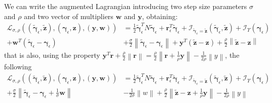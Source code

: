 \documentclass{svproc}
\newcommand{\vect}[1]{\bm{#1}}
\newcommand{\norm}[1]{\left\lVert#1\right\rVert}
\begin{document}
We can write the augmented Lagrangian introducing two step size parameters $\sigma$ and $\rho$ and two vector of multipliers $\vect{w}$ and $\vect{y}$, obtaining:
\begin{align}
\mathcal{L}_{\sigma,\rho} \left((\tilde{\vect{\gamma}}_\epsilon,\tilde{\vect{z}}),(\vect{\gamma}_\epsilon,\vect{z}),(\vect{y},\vect{w})\right) &= 
\frac{1}{2} \tilde{\vect{\gamma}}_\epsilon^T N \tilde{\vect{\gamma}}_\epsilon + \vect{r}^T_\epsilon \tilde{\vect{\gamma}}_\epsilon  
+  \mathcal{I}_{\tilde{\vect{\gamma}}_\epsilon = \tilde{\vect{z}}}(\tilde{\vect{\gamma}}_\epsilon,\tilde{\vect{z}}) 
+  \mathcal{I}_\Upsilon(\vect{\gamma}_\epsilon) \nonumber \\
+ \vect{w}^T (\tilde{\vect{\gamma}}_\epsilon - \vect{\gamma}_\epsilon) 
&+ \frac{\sigma}{2} \norm{\tilde{\vect{\gamma}}_\epsilon - \vect{\gamma}_\epsilon} 
+ \vect{y}^T (\tilde{\vect{z}} - \vect{z}) 
+ \frac{\rho}{2} \norm{\tilde{\vect{z}} - \vect{z}}
\end{align}
that is also, using the property $\vect{y}^T\vect{r} + \frac{\rho}{2}\norm{\vect{r}} = \frac{\rho}{2}\norm{\vect{r}+\frac{1}{\rho} \vect{y}} - \frac{1}{2\rho} \norm{y}$, the following
\begin{align}
\mathcal{L}_{\sigma,\rho} \left((\tilde{\vect{\gamma}}_\epsilon,\tilde{\vect{z}}),(\vect{\gamma}_\epsilon,\vect{z}),(\vect{y},\vect{w})\right) &= 
\frac{1}{2} \tilde{\vect{\gamma}}_\epsilon^T N \tilde{\vect{\gamma}}_\epsilon + \vect{r}^T_\epsilon \tilde{\vect{\gamma}}_\epsilon  
+  \mathcal{I}_{\tilde{\vect{\gamma}}_\epsilon = \tilde{\vect{z}}}(\tilde{\vect{\gamma}}_\epsilon,\tilde{\vect{z}}) 
+  \mathcal{I}_\Upsilon(\vect{\gamma}_\epsilon) \nonumber \\
+ \frac{\sigma}{2} \norm{\tilde{\vect{\gamma}}_\epsilon - \vect{\gamma}_\epsilon + \frac{1}{\sigma} \vect{w}} 
&- \frac{1}{2\sigma} \norm{w}
+ \frac{\rho}{2} \norm{\tilde{\vect{z}} - \vect{z} + \frac{1}{\rho} \vect{y}}
- \frac{1}{2\rho} \norm{y}
\end{align}
\end{document}
